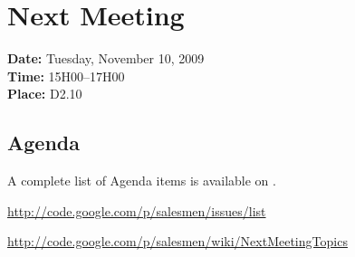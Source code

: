 \documentclass[a4paper, 12pt]{article}
\begin{document}
	\section{Next Meeting}

		\textbf{Date:} Tuesday, November 10, 2009\\
		\textbf{Time:} 15H00--17H00\\
		\textbf{Place:} D2.10\\
	
		\subsection{Agenda}
A complete list of Agenda items is available on \cite{site3}.
	
	\begin{thebibliography}{99}
	
		\href{http://code.google.com/p/salesmen/issues/list}{http://code.google.com/p/salesmen/issues/list}
		
		\href{http://code.google.com/p/salesmen/wiki/NextMeetingTopics}{http://code.google.com/p/salesmen/wiki/NextMeetingTopics}
		

		

		
	\end{thebibliography}	
		
\end{document}
